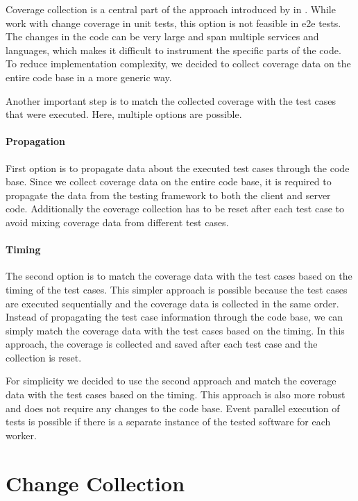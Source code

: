 Coverage collection is a central part of the approach introduced by \citeauthor*{bell_deflaker_2018} in  \autocite{bell_deflaker_2018}.
While \citeauthor*{bell_deflaker_2018} work with change coverage in unit tests, this option is not feasible in \ac{e2e} tests.
The changes in the code can be very large and span multiple services and languages, which makes it difficult to instrument the specific parts of the code.
To reduce implementation complexity, we decided to collect coverage data on the entire code base in a more generic way.

Another important step is to match the collected coverage with the test cases that were executed.
Here, multiple options are possible.

\paragraph{Propagation} First option is to propagate data about the executed test cases through the code base.
Since we collect coverage data on the entire code base, it is required to propagate the data from the testing framework to both the client and server code.
Additionally the coverage collection has to be reset after each test case to avoid mixing coverage data from different test cases.

\paragraph{Timing} The second option is to match the coverage data with the test cases based on the timing of the test cases.
This simpler approach is possible because the test cases are executed sequentially and the coverage data is collected in the same order.
Instead of propagating the test case information through the code base, we can simply match the coverage data with the test cases based on the timing.
In this approach, the coverage is collected and saved after each test case and the collection is reset.

For simplicity we decided to use the second approach and match the coverage data with the test cases based on the timing.
This approach is also more robust and does not require any changes to the code base.
Event parallel execution of tests is possible if there is a separate instance of the tested software for each worker.

\section{Change Collection}

